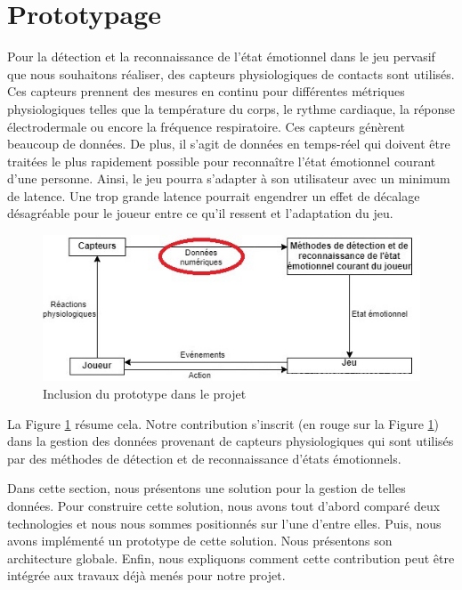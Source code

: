 \documentclass[11pt]{article}
\begin{document}
\section{Prototypage}\label{sec:prototypage}
	Pour la détection et la reconnaissance de l'état émotionnel dans le jeu pervasif que nous souhaitons réaliser, des  capteurs physiologiques de contacts sont utilisés.
	Ces capteurs prennent des mesures en continu pour différentes métriques physiologiques telles que la température du corps, le rythme cardiaque, la réponse électrodermale ou encore la fréquence respiratoire.
	Ces capteurs génèrent beaucoup de données.
	De plus, il s'agit de données en temps-réel qui doivent être traitées le plus rapidement possible pour reconnaître l'état émotionnel courant d'une personne. 
	Ainsi, le jeu pourra s'adapter à son utilisateur avec un minimum de latence. 
	Une trop grande latence pourrait engendrer un effet de décalage désagréable pour le joueur entre ce qu'il ressent et l'adaptation du jeu.
	\begin{figure}
		\centering
		\includegraphics[scale=0.8]{../include/explication-prototype.jpg}
		\caption{Inclusion du prototype dans le projet}
		\label{fig:syntprototype}
	\end{figure}
	La Figure \ref{fig:syntprototype} résume cela.
	Notre contribution s'inscrit (en rouge sur la Figure \ref{fig:syntprototype}) dans la gestion des données provenant de capteurs physiologiques qui sont utilisés par des méthodes de détection et de reconnaissance d'états émotionnels. \par
	Dans cette section, nous présentons une solution pour la gestion de telles données. 
	Pour construire cette solution, nous avons tout d'abord comparé deux technologies et nous nous sommes positionnés sur l'une d'entre elles.
	Puis, nous avons implémenté un prototype de cette solution.
	Nous présentons son architecture globale.
	Enfin, nous expliquons comment cette contribution peut être intégrée aux travaux déjà menés pour notre projet.
\end{document}
